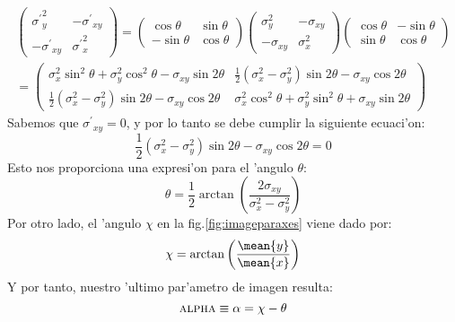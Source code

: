 \begin{multline}
  \label{eq:rotexplicit}
  \begin{pmatrix}
    {\sigma^\prime}_y^2 & -{\sigma^\prime}_{xy} \\ -{\sigma^\prime}_{xy} & {\sigma^\prime}_x^2
  \end{pmatrix}
  =
  \begin{pmatrix}
    \cos\theta & \sin\theta \\ -\sin\theta & \cos\theta
  \end{pmatrix}
  \begin{pmatrix}
    \sigma_y^2 & -\sigma_{xy} \\ -\sigma_{xy} & \sigma_x^2
  \end{pmatrix}
  \begin{pmatrix}
    \cos\theta & -\sin\theta \\ \sin\theta & \cos\theta
  \end{pmatrix} \\
  =
  \begin{pmatrix}
    \sigma_x^2 \sin^2\theta + \sigma_y^2 \cos^2\theta 
    - \sigma_{xy} \sin2\theta&
    \frac{1}{2}(\sigma_x^2 - \sigma_y^2)\sin2\theta  
    - \sigma_{xy}\cos2\theta \\
    \frac{1}{2}(\sigma_x^2 - \sigma_y^2)\sin2\theta 
    - \sigma_{xy}\cos2\theta &
    \sigma_x^2 \cos^2\theta + \sigma_y^2 \sin^2\theta 
    + \sigma_{xy} \sin2\theta
  \end{pmatrix}
\end{multline}
%
Sabemos que ${\sigma^\prime}_{xy} = 0$, y por lo tanto se debe cumplir la
siguiente ecuaci'on:
%
\begin{equation}
  \label{eq:sigmapxy}
  \frac{1}{2}(\sigma_x^2 - \sigma_y^2)\sin2\theta  
    - \sigma_{xy}\cos2\theta = 0
\end{equation}
%
Esto nos proporciona una expresi'on para el 'angulo $\theta$:
%
\begin{equation}
  \label{eq:theta}
  \theta = \frac{1}{2} \arctan 
  \left(\frac{2\sigma_{xy}}{\sigma_x^2 - \sigma_y^2}\right)
\end{equation}
%
Por otro lado, el 'angulo $\chi$ en la fig.\ref{fig:imageparaxes}
viene dado por:
%
\begin{equation}
  \label{eq:chi}
  \chi = \arctan\left(\frac{\mean{y}}{\mean{x}}\right)
\end{equation}
%
Y por tanto, nuestro 'ultimo par'ametro de imagen resulta:
%
\begin{equation}
  \label{eq:alpha}
  \text{\scshape alpha} \equiv \alpha = \chi - \theta
\end{equation}


